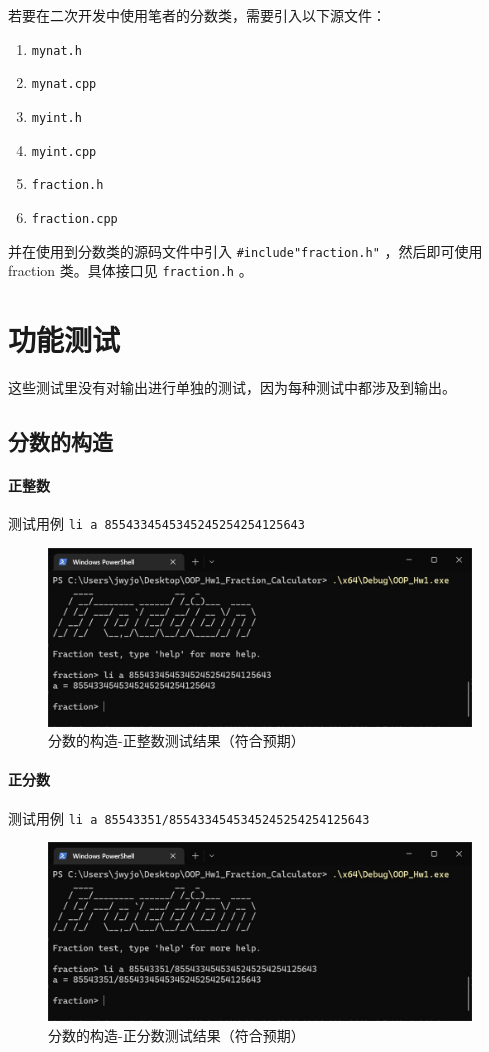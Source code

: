 \documentclass[cn,black,12pt,normal]{elegantnote}
\begin{document}
若要在二次开发中使用笔者的分数类，需要引入以下源文件：
\begin{enumerate}
    \item \lstinline{mynat.h}
    \item \lstinline{mynat.cpp}
    \item \lstinline{myint.h}
    \item \lstinline{myint.cpp}
    \item \lstinline{fraction.h}
    \item \lstinline{fraction.cpp}
\end{enumerate}
并在使用到分数类的源码文件中引入 \lstinline{#include"fraction.h"} ，然后即可使用 fraction 类。具体接口见 \lstinline{fraction.h} 。

\section{功能测试}

这些测试里没有对输出进行单独的测试，因为每种测试中都涉及到输出。

\subsection{分数的构造}

\paragraph{正整数} 测试用例 \lstinline{li a 8554334545345245254254125643}
\begin{figure}[H]
    \centering
    \includegraphics[width=.8\textwidth]{imgs/test_construct_positive_int.jpg}
    \caption{分数的构造-正整数测试结果（符合预期）}
\end{figure}

\paragraph{正分数} 测试用例 \lstinline{li a 85543351/8554334545345245254254125643}
\begin{figure}[H]
    \centering
    \includegraphics[width=.8\textwidth]{imgs/test_construct_positive_frac.jpg}
    \caption{分数的构造-正分数测试结果（符合预期）}
\end{figure}
\end{document}

